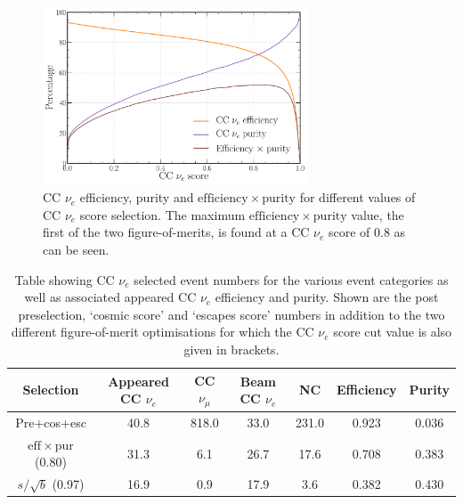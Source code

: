 \begin{figure} %
    \includegraphics[width=0.7\textwidth]{diagrams/6-cvn/chipsnet/final_nuel_eff_curves.pdf}
    \caption[CC $\nu_{e}$ efficiency, purity and $\mathrm{efficiency}\times\mathrm{purity}$.]
    {CC $\nu_{e}$ efficiency, purity and $\mathrm{efficiency}\times\mathrm{purity}$ for different
        values of CC $\nu_{e}$ score selection. The maximum
        $\mathrm{efficiency}\times\mathrm{purity}$ value, the first of the two figure-of-merits,
        is found at a CC $\nu_{e}$ score of 0.8 as can be seen.}
    \label{fig:final_nuel_eff_curves}
\end{figure}

\begin{table}
    \begin{tabular}{ccccccc}
        Selection                               & Appeared CC $\nu_{e}$ & CC $\nu_{\mu}$ & Beam CC $\nu_{e}$ & NC    & Efficiency & Purity \\
        \midrule
        Pre+cos+esc                             & 40.8                  & 818.0          & 33.0              & 231.0 & 0.923      & 0.036  \\
        \midrule
        $\mathrm{eff}\times\mathrm{pur}$ (0.80) & 31.3                  & 6.1            & 26.7              & 17.6  & 0.708      & 0.383  \\
        $s/\sqrt{b}$ (0.97)                     & 16.9                  & 0.9            & 17.9              & 3.6   & 0.382      & 0.430  \\
    \end{tabular}
    \caption[Table showing CC $\nu_{e}$ selected event numbers.]
    {Table showing CC $\nu_{e}$ selected event numbers for the various event categories as well as
        associated appeared CC $\nu_{e}$ efficiency and purity. Shown are the post preselection,
        `cosmic score' and `escapes score' numbers in addition to the two different
        figure-of-merit optimisations for which the CC $\nu_{e}$ score cut value is also given in
        brackets.}
    \label{tab:nuel_selection}
\end{table}

